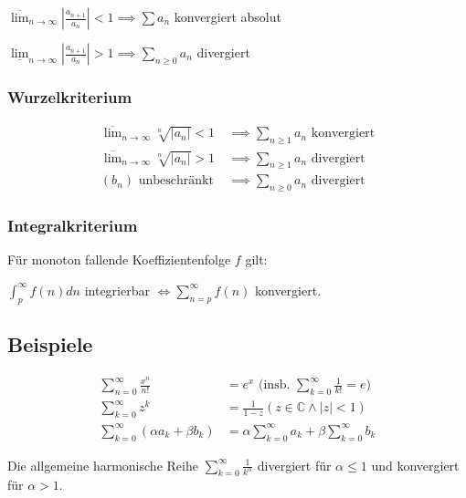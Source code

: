 $\overline\lim_{n \to \infty} |\frac{a_{n+1}}{a_n}| < 1 \implies \sum a_n$ konvergiert absolut

$\underline\lim_{n \to \infty} |\frac{a_{n+1}}{a_n}| > 1 \implies \sum_{n\geq 0} a_n$ divergiert

\subsubsection*{Wurzelkriterium}

\vspace*{-4mm}
\begin{align*}
	\overline\lim_{n \to \infty} \sqrt[n]{|a_n|} < 1 &\implies \textstyle\sum_{n\geq 1} a_n \text{ konvergiert} \\
	\overline\lim_{n \to \infty} \sqrt[n]{|a_n|} > 1 &\implies \textstyle\sum_{n\geq 1} a_n \text{ divergiert} \\
	(b_n) \text{ unbeschränkt } &\implies \textstyle\sum_{n\geq 0} a_n \text{ divergiert}
\end{align*}

\subsubsection*{Integralkriterium}

Für monoton fallende Koeffizientenfolge $f$ gilt:

$\int_p^\infty f(n) dn$ integrierbar $\Leftrightarrow \sum_{n=p}^\infty f(n)$ konvergiert.

\subsection*{Beispiele}

\vspace*{-8mm}
\begin{align*}
	\textstyle\sum_{n=0}^\infty \frac{x^n}{n!} &= e^x \text{ (insb. } \textstyle\sum_{k=0}^{\infty} \frac{1}{k!} = e) \\
	\textstyle\sum_{k=0}^{\infty} z^k &= \frac{1}{1-z} (z \in \mathbb{C} \land |z|<1) \\
	\textstyle\sum_{k=0}^{\infty} (\alpha a_k + \beta b_k) &= \alpha \textstyle\sum_{k=0}^{\infty} a_k + \beta \textstyle\sum_{k=0}^{\infty} b_k
\end{align*}
\vspace*{-4mm}

Die allgemeine harmonische Reihe $\sum_{k=0}^\infty \frac{1}{k^\alpha}$ divergiert für $\alpha \leq 1$ und konvergiert für $\alpha > 1$.

